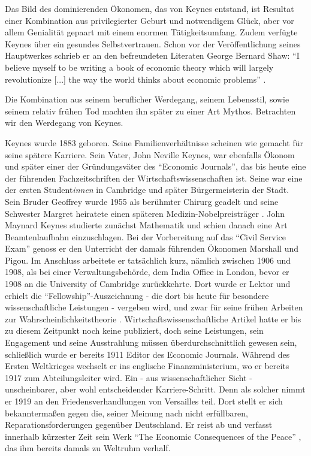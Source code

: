 Das Bild des dominierenden Ökonomen, das von Keynes entstand, ist Resultat einer Kombination aus privilegierter Geburt und notwendigem Glück, aber vor allem Genialität gepaart mit einem enormen Tätigkeitsumfang. Zudem verfügte Keynes über ein gesundes Selbstvertrauen. Schon vor der Veröffentlichung seines Hauptwerkes schrieb er an den befreundeten Literaten George Bernard Shaw: "`I believe myself to be writing a book of economic theory which will largely revolutionize [...] the way the world thinks about economic problems"' \parencite[S.13]{Warsh}. 

Die Kombination aus seinem beruflicher Werdegang, seinem Lebensstil, sowie seinem relativ frühen Tod machten ihn später zu einer Art Mythos. Betrachten wir den Werdegang von Keynes. 

Keynes wurde 1883 geboren. Seine Familienverhältnisse scheinen wie gemacht für seine spätere Karriere. Sein Vater, John Neville Keynes, war ebenfalls Ökonom und später einer der Gründungsväter des "`Economic Journals"', das bis heute eine der führenden Fachzeitschriften der Wirtschaftswissenschaften ist. Seine war eine der ersten Student\textit{innen} in Cambridge und später Bürgermeisterin der Stadt. Sein Bruder Geoffrey wurde 1955 als berühmter Chirurg geadelt und seine Schwester Margret heiratete einen späteren Medizin-Nobelpreisträger \parencite[S. 275]{Scherf1989}. John Maynard Keynes studierte zunächst Mathematik und schien danach eine Art Beamtenlaufbahn einzuschlagen. Bei der Vorbereitung auf das "`Civil Service Exam"' genoss er den Unterricht der damals führenden Ökonomen Marshall und Pigou. Im Anschluss arbeitete er tatsächlich kurz, nämlich zwischen 1906 und 1908, als bei einer Verwaltungsbehörde, dem India Office in London, bevor er 1908 an die University of Cambridge zurückkehrte. Dort wurde er Lektor und erhielt die "`Fellowship"'-Auszeichnung - die dort bis heute für besondere wissenschaftliche Leistungen - vergeben wird, und zwar für seine frühen Arbeiten zur Wahrscheinlichkeitstheorie \parencite[S. 276]{Scherf1989}. Wirtschaftswissenschaftliche Artikel hatte er bis zu diesem Zeitpunkt noch keine publiziert, doch seine Leistungen, sein Engagement und seine Ausstrahlung müssen überdurchschnittlich gewesen sein, schließlich wurde er bereits 1911 Editor des Economic Journals. Während des Ersten Weltkrieges wechselt er ins englische Finanzministerium, wo er bereits 1917 zum Abteilungsleiter wird. Ein - aus wissenschaftlicher Sicht - unscheinbarer, aber wohl entscheidender Karriere-Schritt. Denn als solcher nimmt er 1919 an den Friedensverhandlungen von Versailles teil. Dort stellt er sich bekanntermaßen gegen die, seiner Meinung nach nicht erfüllbaren, Reparationsforderungen gegenüber Deutschland. Er reist ab und verfasst innerhalb kürzester Zeit sein Werk "`The Economic Consequences of the Peace"' \parencite{Keynes1919}, das ihm bereits damals zu Weltruhm verhalf. 

